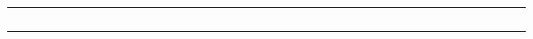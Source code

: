 \documentclass{article}
\begin{document}
\begin{minipage}{\linewidth}
\begin{tabular}{|*{10}{c}*{31}{||c}|}
          & & & & & & & & & & & & & & & & & & & & & & & & & & & & & & & \\  
          & & & & & & & & & & & & & & & & & & & & & & & & & & & & & & & \\  
          & & & & & & & & & & & & & & & & & & & & & & & & & & & & & & & \\  
          & & & & & & & & & & & & & & & & & & & & & & & & & & & & & & & \\  
       & & & & & & & & & & & & & & & & & & & & & & & & & & & & & & & \\ \hline 
\end{tabular} 
\end{minipage} 
\end{document}
